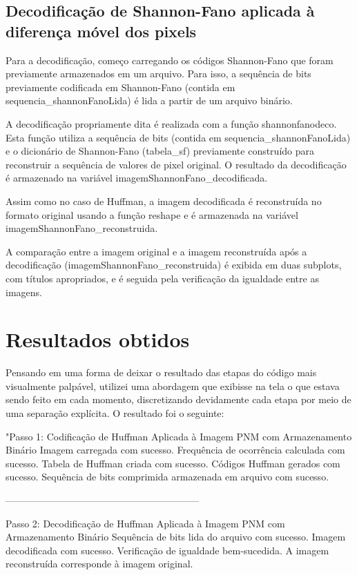 \documentclass{article}
\begin{document}
\subsection{Decodificação de Shannon-Fano aplicada à diferença móvel dos pixels}

Para a decodificação, começo carregando os códigos Shannon-Fano que foram previamente armazenados em um arquivo. Para isso, a sequência de bits previamente codificada em Shannon-Fano (contida em sequencia\_shannonFanoLida) é lida a partir de um arquivo binário.

A decodificação propriamente dita é realizada com a função shannonfanodeco. Esta função utiliza a sequência de bits (contida em sequencia\_shannonFanoLida) e o dicionário de Shannon-Fano (tabela\_sf) previamente construído para reconstruir a sequência de valores de pixel original. O resultado da decodificação é armazenado na variável imagemShannonFano\_decodificada.

Assim como no caso de Huffman, a imagem decodificada é reconstruída no formato original usando a função reshape e é armazenada na variável imagemShannonFano\_reconstruida.

A comparação entre a imagem original e a imagem reconstruída após a decodificação (imagemShannonFano\_reconstruida) é exibida em duas subplots, com títulos apropriados, e é seguida pela verificação da igualdade entre as imagens.

\section{Resultados obtidos}

Pensando em uma forma de deixar o resultado das etapas do código mais visualmente palpável, utilizei uma abordagem que exibisse na tela o que estava sendo feito em cada momento, discretizando devidamente cada etapa por meio de uma separação explícita. O resultado foi o seguinte:

"Passo 1: Codificação de Huffman Aplicada à Imagem PNM com Armazenamento Binário
Imagem carregada com sucesso.
Frequência de ocorrência calculada com sucesso.
Tabela de Huffman criada com sucesso.
Códigos Huffman gerados com sucesso.
Sequência de bits comprimida armazenada em arquivo com sucesso.

------------------------------------------------------------

Passo 2: Decodificação de Huffman Aplicada à Imagem PNM com Armazenamento Binário
Sequência de bits lida do arquivo com sucesso.
Imagem decodificada com sucesso.
Verificação de igualdade bem-sucedida. A imagem reconstruída corresponde à imagem original.
\end{document}
